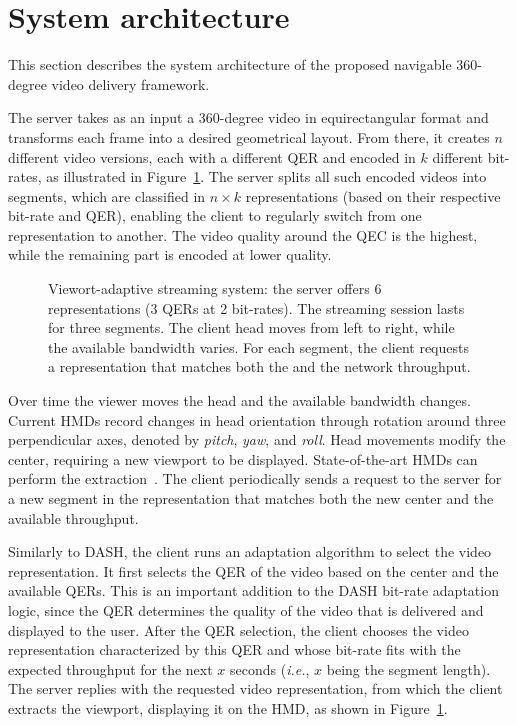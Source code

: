 \section{System architecture}


This section describes the system architecture of the proposed
navigable $360$-degree video delivery framework.

The server takes as an input a $360$-degree video in
equirectangular format and transforms each frame into a desired
geometrical layout. From there, it creates $n$ different video
versions, each with a different \ac{QER} and encoded in $k$ different
bit-rates, as illustrated in Figure~\ref{fig:newdelivery}. The server
splits all such encoded videos into segments, which are classified in
$n\!\times\!k$ representations (based on their respective bit-rate and
\ac{QER}), enabling the client to regularly switch from one
representation to another. The video quality around the
\ac{QEC} is the highest, while the remaining part is encoded at lower
quality.

\begin{figure}
   \centering
   
   \caption{Viewort-adaptive streaming system: the server offers \num{6} representations (\num{3} \acp{QER} at \num{2} bit-rates). The streaming session lasts for three segments. The client head moves from left to right, while the available bandwidth varies. For each segment, the client requests a representation that matches both the \FoV{} and the network throughput.}
   \label{fig:newdelivery}
\end{figure}

Over time the viewer moves the head and the
available bandwidth changes. Current \acp{HMD} record changes
in head orientation through rotation around three perpendicular axes,
denoted by \emph{pitch}, \emph{yaw}, and \emph{roll}.
Head movements modify the \FoV{} center, requiring a new viewport
to be displayed. State-of-the-art \acp{HMD} can perform the
extraction~\cite{fovhmds}. The client periodically sends a request
to the server for a new segment in the representation that
matches both the new \FoV{} center and the available throughput.

Similarly to \ac{DASH}, the client runs
an adaptation algorithm to select the video representation. It first
selects the \ac{QER} of the video based on the \FoV{} center and
the available \acp{QER}. This is an important addition to
the \ac{DASH} bit-rate adaptation logic, since the \ac{QER} determines
the quality of the video that is delivered and displayed to the user.
After the \ac{QER} selection, the client chooses the video
representation characterized by this \ac{QER} and whose bit-rate fits
with the expected throughput for the next $x$ seconds (\textit{i.e.},
$x$ being the segment length). The server replies
with the requested video representation, from which the
client extracts the viewport, displaying it on the \ac{HMD}, as
shown in Figure~\ref{fig:newdelivery}.

